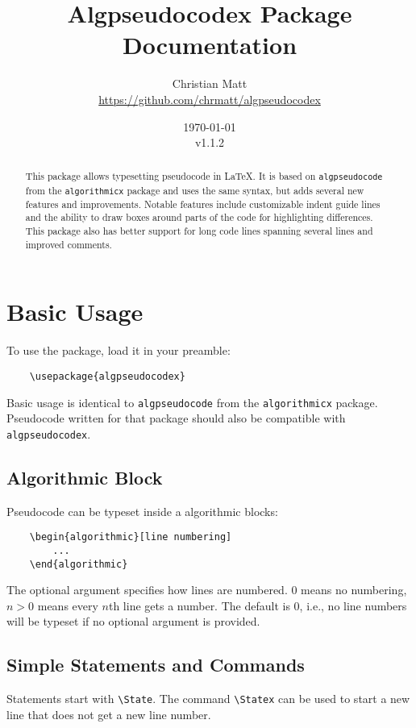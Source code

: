 \documentclass[11pt,a4paper,USenglish]{article}
\title{\bf{Algpseudocodex Package Documentation}}
\author{Christian Matt \\ \url{https://github.com/chrmatt/algpseudocodex}}
\date{\today\\v1.1.2}
\begin{document}
\maketitle

\begin{abstract}
	This package allows typesetting pseudocode in \LaTeX. It is based on \texttt{algpseudocode} from the \texttt{algorithmicx} package and uses the same syntax, but adds several new features and improvements. Notable features include customizable indent guide lines and the ability to draw boxes around parts of the code for highlighting differences. This package also has better support for long code lines spanning several lines and improved comments.
\end{abstract}

\newpage

\tableofcontents

\newpage

\section{Basic Usage}
To use the package, load it in your preamble:
\begin{verbatim}
	\usepackage{algpseudocodex}
\end{verbatim}

Basic usage is identical to \texttt{algpseudocode} from the \texttt{algorithmicx} package. Pseudocode written for that package should also be compatible with \texttt{algpseudocodex}.

\subsection{Algorithmic Block}
Pseudocode can be typeset inside a algorithmic blocks:
\begin{verbatim}
	\begin{algorithmic}[line numbering]
	    ...
	\end{algorithmic}
\end{verbatim}
The optional argument specifies how lines are numbered. $0$ means no numbering, $n > 0$ means every $n$th line gets a number. The default is $0$, i.e., no line numbers will be typeset if no optional argument is provided.

\subsection{Simple Statements and Commands}
Statements start with \verb|\State|. The command \verb|\Statex| can be used to start a new line that does not get a new line number.
\end{document}
